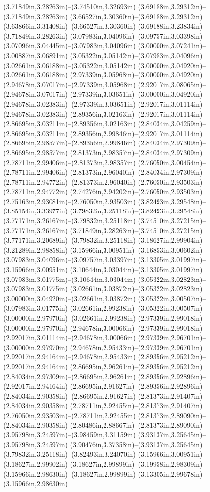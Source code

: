 (3.71849in,3.28263in)--(3.74510in,3.32693in) (3.69188in,3.29312in)--(3.71849in,3.28263in) (3.66527in,3.30360in)--(3.69188in,3.29312in) (3.63866in,3.31408in)--(3.66527in,3.30360in) (3.69188in,3.23834in)--(3.71849in,3.28263in) (3.07983in,3.04096in)--(3.09757in,3.03398in) (3.07096in,3.04445in)--(3.07983in,3.04096in) (3.00000in,3.07241in)--(3.00887in,3.06891in) (3.05322in,3.05142in)--(3.07983in,3.04096in) (3.02661in,3.06188in)--(3.05322in,3.05142in) (3.00000in,3.04920in)--(3.02661in,3.06188in) (2.97339in,3.05968in)--(3.00000in,3.04920in) (2.94678in,3.07017in)--(2.97339in,3.05968in) (2.92017in,3.08065in)--(2.94678in,3.07017in) (2.97339in,3.03651in)--(3.00000in,3.04920in) (2.94678in,3.02383in)--(2.97339in,3.03651in) (2.92017in,3.01114in)--(2.94678in,3.02383in) (2.89356in,3.02163in)--(2.92017in,3.01114in) (2.86695in,3.03211in)--(2.89356in,3.02163in) (2.84034in,3.04259in)--(2.86695in,3.03211in) (2.89356in,2.99846in)--(2.92017in,3.01114in) (2.86695in,2.98577in)--(2.89356in,2.99846in) (2.84034in,2.97309in)--(2.86695in,2.98577in) (2.81373in,2.98357in)--(2.84034in,2.97309in) (2.78711in,2.99406in)--(2.81373in,2.98357in) (2.76050in,3.00454in)--(2.78711in,2.99406in) (2.81373in,2.96040in)--(2.84034in,2.97309in) (2.78711in,2.94772in)--(2.81373in,2.96040in) (2.76050in,2.93503in)--(2.78711in,2.94772in) (2.74276in,2.94202in)--(2.76050in,2.93503in) (2.75163in,2.93081in)--(2.76050in,2.93503in) (3.82493in,3.29548in)--(3.85154in,3.33977in) (3.79832in,3.25118in)--(3.82493in,3.29548in) (3.77171in,3.26167in)--(3.79832in,3.25118in) (3.74510in,3.27215in)--(3.77171in,3.26167in) (3.71849in,3.28263in)--(3.74510in,3.27215in) (3.77171in,3.20689in)--(3.79832in,3.25118in) (3.18627in,2.99904in)--(3.21289in,2.98858in) (3.15966in,3.00951in)--(3.16853in,3.00602in) (3.07983in,3.04096in)--(3.09757in,3.03397in) (3.13305in,3.01997in)--(3.15966in,3.00951in) (3.10644in,3.03044in)--(3.13305in,3.01997in) (3.07983in,3.01775in)--(3.10644in,3.03044in) (3.05322in,3.02823in)--(3.07983in,3.01775in) (3.02661in,3.03872in)--(3.05322in,3.02823in) (3.00000in,3.04920in)--(3.02661in,3.03872in) (3.05322in,3.00507in)--(3.07983in,3.01775in) (3.02661in,2.99238in)--(3.05322in,3.00507in) (3.00000in,2.97970in)--(3.02661in,2.99238in) (2.97339in,2.99018in)--(3.00000in,2.97970in) (2.94678in,3.00066in)--(2.97339in,2.99018in) (2.92017in,3.01114in)--(2.94678in,3.00066in) (2.97339in,2.96701in)--(3.00000in,2.97970in) (2.94678in,2.95433in)--(2.97339in,2.96701in) (2.92017in,2.94164in)--(2.94678in,2.95433in) (2.89356in,2.95212in)--(2.92017in,2.94164in) (2.86695in,2.96261in)--(2.89356in,2.95212in) (2.84034in,2.97309in)--(2.86695in,2.96261in) (2.89356in,2.92896in)--(2.92017in,2.94164in) (2.86695in,2.91627in)--(2.89356in,2.92896in) (2.84034in,2.90358in)--(2.86695in,2.91627in) (2.81373in,2.91407in)--(2.84034in,2.90358in) (2.78711in,2.92455in)--(2.81373in,2.91407in) (2.76050in,2.93503in)--(2.78711in,2.92455in) (2.81373in,2.89090in)--(2.84034in,2.90358in) (2.80486in,2.88667in)--(2.81373in,2.89090in) (3.95798in,3.24597in)--(3.98459in,3.31159in) (3.93137in,3.25645in)--(3.95798in,3.24597in) (3.90476in,3.37358in)--(3.93137in,3.25645in) (3.79832in,3.25118in)--(3.82493in,3.24070in) (3.15966in,3.00951in)--(3.18627in,2.99902in) (3.18627in,2.99899in)--(3.19958in,2.98309in) (3.15966in,2.98630in)--(3.18627in,2.99899in) (3.13305in,2.99678in)--(3.15966in,2.98630in) 
